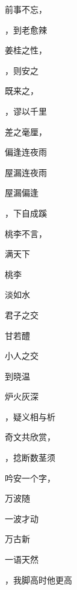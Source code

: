 \documentclass[12pt, a4paper, addpoints]{exam}
\begin{document}
\begin{multicols}{2}
\begin{questions}
\question[1] 前事不忘，\uline{\qquad\qquad\qquad}

\question[1] \uline{\qquad\qquad\qquad}，到老愈辣

\question[1] 姜桂之性，\uline{\qquad\qquad\qquad}

\question[1] \uline{\qquad\qquad\qquad}，则安之

\question[1] 既来之，\uline{\qquad\qquad\qquad}

\question[1] \uline{\qquad\qquad\qquad}，谬以千里

\question[1] 差之毫厘，\uline{\qquad\qquad\qquad}

\question[1] \uline{\qquad\qquad\qquad}偏逢连夜雨

\question[1] 屋漏\uline{\qquad\qquad\qquad}连夜雨

\question[1] 屋漏偏逢\uline{\qquad\qquad\qquad}

\question[1] \uline{\qquad\qquad\qquad}，下自成蹊

\question[1] 桃李不言，\uline{\qquad\qquad\qquad}

\question[1] \uline{\qquad\qquad\qquad}满天下

\question[1] 桃李\uline{\qquad\qquad\qquad}

\question[1] \uline{\qquad\qquad\qquad}淡如水

\question[1] 君子之交\uline{\qquad\qquad\qquad}

\question[1] \uline{\qquad\qquad\qquad}甘若醴

\question[1] 小人之交\uline{\qquad\qquad\qquad}

\question[1] \uline{\qquad\qquad\qquad}到晓温

\question[1] 炉火灰深\uline{\qquad\qquad\qquad}

\question[1] \uline{\qquad\qquad\qquad}，疑义相与析

\question[1] 奇文共欣赏，\uline{\qquad\qquad\qquad}

\question[1] \uline{\qquad\qquad\qquad}，捻断数茎须

\question[1] 吟安一个字，\uline{\qquad\qquad\qquad}

\question[1] \uline{\qquad\qquad\qquad}万波随

\question[1] 一波才动\uline{\qquad\qquad\qquad}

\question[1] \uline{\qquad\qquad\qquad}万古新

\question[1] 一语天然\uline{\qquad\qquad\qquad}

\question[1] \uline{\qquad\qquad\qquad}，我脚高时他更高


\end{questions}
\end{multicols}
\end{document}
